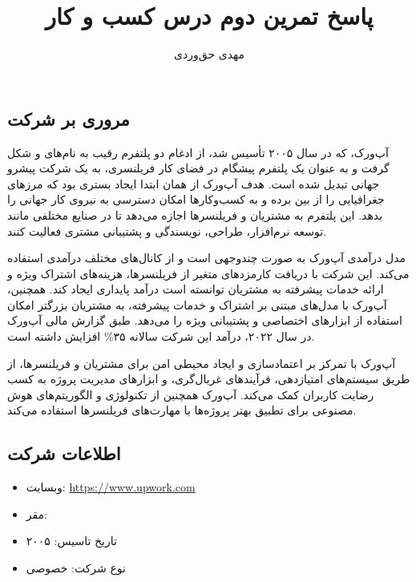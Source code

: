 \documentclass[dvipsnames, svgnames, x11names, 11pt, twocolumn]{article}
\title{پاسخ تمرین دوم درس کسب و کار}
\author{مهدی حق‌وردی}
\date{}
\begin{document}
\maketitle
\tableofcontents
\section{}
\subsection{مروری بر شرکت}
آپ‌ورک، که در سال ۲۰۰۵ تأسیس شد، از ادغام دو پلتفرم رقیب به نام‌های  و  شکل گرفت و به عنوان یک پلتفرم پیشگام در فضای کار فریلنسری، به یک شرکت پیشرو جهانی تبدیل شده است. هدف آپ‌ورک از همان ابتدا ایجاد بستری بود که مرزهای جغرافیایی را از بین برده و به کسب‌وکارها امکان دسترسی به نیروی کار جهانی را بدهد. این پلتفرم به مشتریان و فریلنسرها اجازه می‌دهد تا در صنایع مختلفی مانند توسعه نرم‌افزار، طراحی، نویسندگی و پشتیبانی مشتری  فعالیت کنند.

مدل درآمدی آپ‌ورک به صورت چندوجهی است و از کانال‌های مختلف درآمدی استفاده می‌کند. این شرکت با دریافت کارمزد‌های متغیر از فریلنسرها، هزینه‌های اشتراک ویژه و ارائه خدمات پیشرفته به مشتریان توانسته است درآمد پایداری ایجاد کند. همچنین، آپ‌ورک با مدل‌های مبتنی بر اشتراک و خدمات پیشرفته، به مشتریان بزرگتر امکان استفاده از ابزارهای اختصاصی و پشتیبانی ویژه را می‌دهد. طبق گزارش مالی آپ‌ورک در سال ۲۰۲۲، درآمد این شرکت سالانه ۳۵\% افزایش داشته است.

آپ‌ورک با تمرکز بر اعتمادسازی و ایجاد محیطی امن برای مشتریان و فریلنسرها، از طریق سیستم‌های امتیازدهی، فرآیندهای غربال‌گری، و ابزارهای مدیریت پروژه به کسب رضایت کاربران کمک می‌کند. آپ‌ورک همچنین از تکنولوژی و الگوریتم‌های هوش مصنوعی برای تطبیق بهتر پروژه‌ها با مهارت‌های فریلنسرها استفاده می‌کند. 

\subsection{اطلاعات شرکت}
\begin{itemize}
\item 
وبسایت:
\url{https://www.upwork.com}

\item 
مقر:

\item 
تاریخ تاسیس: ۲۰۰۵

\item 
نوع شرکت: خصوصی
\end{itemize}
\end{document}
